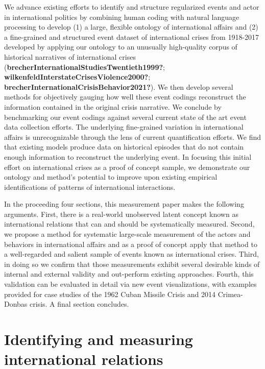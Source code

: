 \documentclass{article}
\begin{document}
We advance existing efforts to identify and structure regularized events
and actor in international politics by combining human coding with
natural language processing to develop (1) a large, flexible ontology of
international affairs and (2) a fine-grained and structured event
dataset of international crises from 1918-2017 developed by applying our
ontology to an unusually high-quality corpus of historical narratives of
international crises
(\textbf{brecherInternationalStudiesTwentieth1999?};
\textbf{wilkenfeldInterstateCrisesViolence2000?};
\textbf{brecherInternationalCrisisBehavior2021?}). We then develop
several methods for objectively gauging how well these event codings
reconstruct the information contained in the original crisis narrative.
We conclude by benchmarking our event codings against several current
state of the art event data collection efforts. The underlying
fine-grained variation in international affairs is unrecognizable
through the lens of current quantification efforts. We find that
existing models produce data on historical episodes that do not contain
enough information to reconstruct the underlying event. In focusing this
initial effort on international crises as a proof of concept sample, we
demonstrate our ontology and method's potential to improve upon existing
empirical identifications of patterns of international interactions.

In the proceeding four sections, this measurement paper makes the
following arguments. First, there is a real-world unobserved latent
concept known as international relations that can and should be
systematically measured. Second, we propose a method for systematic
large-scale measurement of the actors and behaviors in international
affairs and as a proof of concept apply that method to a well-regarded
and salient sample of events known as international crises. Third, in
doing so we confirm that those measurements exhibit several desirable
kinds of internal and external validity and out-perform existing
approaches. Fourth, this validation can be evaluated in detail via new
event visualizations, with examples provided for case studies of the
1962 Cuban Missile Crisis and 2014 Crimea-Donbas crisis. A final section
concludes.

\hypertarget{identifying-and-measuring-international-relations}{%
\section{Identifying and measuring international
relations}\label{identifying-and-measuring-international-relations}}
\end{document}
